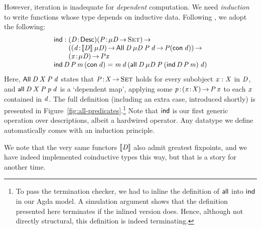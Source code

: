 \newcommand{\SYMBind}{\F{ind}}

However, iteration is inadequate for \emph{dependent} computation.
We need \emph{induction} to write functions whose type depends on inductive
data. Following \citet{benke:universe-generic-prog}, we adopt the following:
%
\[\stk{
\F{ind} : \stk{ \PITEL{\V{D}}{\Desc}
                    \PI{\V{P}}{\Mu{\V{D}} \To \Set}         \\
               (\PI{\V{d}}{\descop{\V{D}}{\Mu{\V{D}}}}       
                \All{\V{D}}{\Mu{\V{D}}}{\V{P}}{\V{d}} \To \V{P} (\Con{\V{d}})) \To \\
               \PI{\V{x}}{\Mu{\V{D}}} \V{P} \V{x} 
} \\
\F{ind}\, \V{D}\, \V{P}\, \V{m}\, (\Con{\V{d}}) = 
    \V{m}\, \V{d}\, (\all{\V{D}}{\Mu{\V{D}}}{\V{P}}
                           {(\F{ind}\, \V{D}\, \V{P}\, \V{m})}
                           {\V{d}})
}\]
%
Here, $\All{\V{D}}{\V{X}}{\V{P}}{\V{d}}$ states that
$\Bhab{\V{P}}{\V{X} \To \Set}$ holds for every subobject $\V{x}:\V{X}$
in \(\V{D}\), and \(\all{\V{D}}{\V{X}}{\V{P}}{\V{p}}{\V{d}}\) is a
`dependent map', applying some
\(\Bhab{\V{p}}{\PIS{\Bhab{\x}{\V{X}}}\V{P}\,\V{x}}\) to each \(\x\)
contained in \(\V{d}\). The full definition (including an extra case,
introduced shortly) is presented in
Figure~\ref{fig:all-predicates}.\footnote{To pass the termination
  checker, we had to inline the definition of $\SYMBall$ into
  $\SYMBind$ in our Agda model. A simulation argument shows that the
  definition presented here terminates if the inlined version
  does. Hence, although not directly structural, this definition is
  indeed terminating.} Note that \(\F{ind}\) is our first generic
operation over descriptions, albeit a hardwired operator.  Any
datatype we define automatically comes with an induction principle.

We note that the very same functors \(\SYMBdescop{\M{D}}\) also admit greatest
fixpoints, and we have indeed implemented coinductive types this way, but
that is a story for another time.

